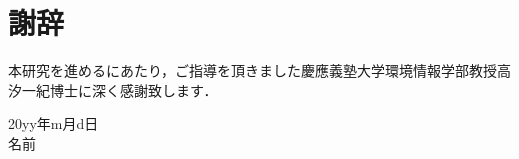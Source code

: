 ﻿  \newcommand{\fulltoday}{\number\day\space \ifcase\month\or
    January\or February\or March\or April\or May\or June\or
    July\or August\or September\or October\or November\or December\fi
    \space\number\year}

\chapter*{謝辞}
本研究を進めるにあたり，ご指導を頂きました慶應義塾大学環境情報学部教授高汐一紀博士に深く感謝致します．

\begin{flushright}
20yy年m月d日\\
名前
\end{flushright}
